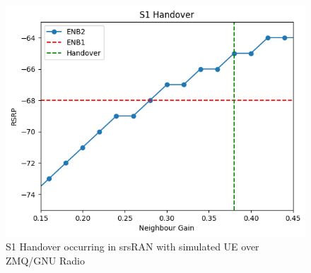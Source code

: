 \begin{figure}
    \centering
    \includegraphics[width=1\linewidth]{src/img/zmq_s1_handover.png}
    \caption{S1 Handover occurring in srsRAN with simulated UE over ZMQ/GNU Radio}
    \label{fig:methods:zmq-s1-handover}
\end{figure}

